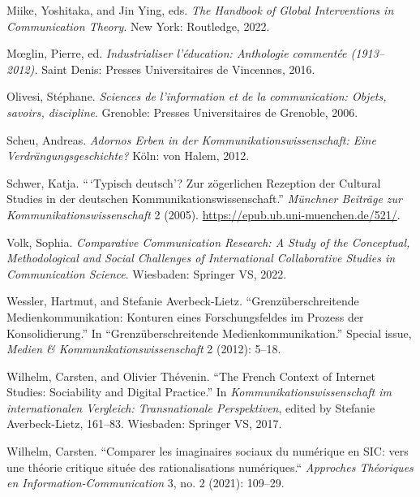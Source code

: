 \documentclass{tufte-handout}
\begin{document}
\begin{hangparas}{.25in}{1}
Miike, Yoshitaka, and Jin Ying, eds. \emph{The Handbook of Global
Interventions in Communication Theory}. New York: Routledge, 2022.

Mœglin, Pierre, ed. \emph{Industrialiser l'éducation: Anthologie
commentée (1913--2012).} Saint Denis: Presses Universitaires de
Vincennes, 2016.

Olivesi, Stéphane. \emph{Sciences de l'information et de la
communication: Objets, savoirs, discipline}. Grenoble: Presses
Universitaires de Grenoble, 2006.

Scheu, Andreas. \emph{Adornos Erben in der Kommunikationswissenschaft:
Eine Verdrängungsgeschichte?} Köln: von Halem, 2012.

Schwer, Katja. ``\,`Typisch deutsch'? Zur zögerlichen Rezeption der
Cultural Studies in der deutschen Kommunikationswissenschaft.''
\emph{Münchner Beiträge zur Kommunikationswissenschaft} 2 (2005).
\url{https://epub.ub.uni-muenchen.de/521/}.

Volk, Sophia. \emph{Comparative Communication Research: A Study of the
Conceptual, Methodological and Social Challenges of International
Collaborative Studies in Communication Science}. Wiesbaden: Springer VS,
2022.

Wessler, Hartmut, and Stefanie Averbeck-Lietz. ``Grenzüberschreitende
Medienkommunikation: Konturen eines Forschungsfeldes im Prozess der
Konsolidierung.'' In ``Grenzüberschreitende Medienkommunikation.''
Special issue, \emph{Medien \& Kommunikationswissenschaft} 2 (2012):
5--18.

Wilhelm, Carsten, and Olivier Thévenin. ``The French Context of Internet
Studies: Sociability and Digital Practice.'' In
\emph{Kommunikationswissenschaft im internationalen Vergleich:
Transnationale Perspektiven}, edited by Stefanie Averbeck-Lietz,
161--83. Wiesbaden: Springer VS, 2017.

Wilhelm, Carsten. ``Comparer les imaginaires sociaux du numérique en
SIC: vers une théorie critique située des rationalisations numériques.``
\emph{Approches Théoriques en Information-Communication} 3, no. 2
(2021): 109--29.







\end{hangparas}
\end{document}
